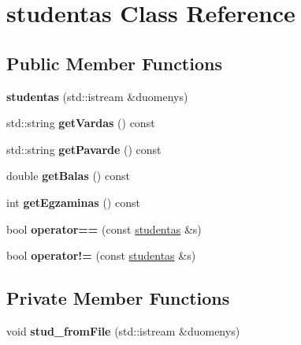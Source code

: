 \hypertarget{classstudentas}{}\section{studentas Class Reference}
\label{classstudentas}
\subsection*{Public Member Functions}
\begin{DoxyCompactItemize}
\item 
\mbox{\label{classstudentas_acb3167a335b73211915751ba1652e302}} 
{\bfseries studentas} (std\+::istream \&duomenys)
\item 
\mbox{\label{classstudentas_a7ebf70d9adaf2009f25967e37468cb25}} 
std\+::string {\bfseries get\+Vardas} () const
\item 
\mbox{\label{classstudentas_a0d290bc24c47b735bd5eac96f9c9e93e}} 
std\+::string {\bfseries get\+Pavarde} () const
\item 
\mbox{\label{classstudentas_a2ed748d9ee5c6b5bfd70bb2d50505289}} 
double {\bfseries get\+Balas} () const
\item 
\mbox{\label{classstudentas_a005a4c3ab079b040898b0ad12ddf23fe}} 
int {\bfseries get\+Egzaminas} () const
\item 
\mbox{\label{classstudentas_a0ad8d0b569e5beb7b34238fa87267b77}} 
bool {\bfseries operator==} (const \mbox{\hyperlink{classstudentas}{studentas}} \&s)
\item 
\mbox{\label{classstudentas_a10674181ae77cc4fe4b65fc0eddf2e8b}} 
bool {\bfseries operator!=} (const \mbox{\hyperlink{classstudentas}{studentas}} \&s)
\end{DoxyCompactItemize}
\subsection*{Private Member Functions}
\begin{DoxyCompactItemize}
\item 
\mbox{\label{classstudentas_a1d8b300aec76a76f0c9a7ae22f6c169d}} 
void {\bfseries stud\+\_\+from\+File} (std\+::istream \&duomenys)
\end{DoxyCompactItemize}
